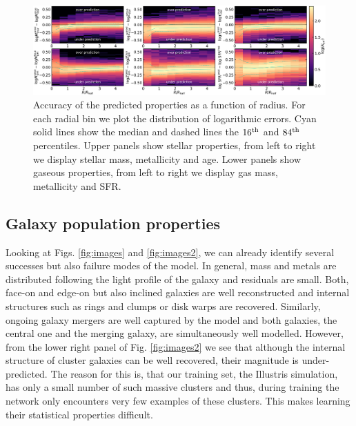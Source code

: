 \documentclass[useAMS,usenatbib]{mnras}
\begin{document}
\begin{figure}
\begin{center}
\includegraphics[width=\textwidth]{./plots/radial_dependence_masked_ugriz.pdf}
\end{center}
\vspace{-.35cm}
\caption{Accuracy of the predicted properties as a function of radius. For each radial bin we plot the distribution of logarithmic errors. Cyan solid lines show the median and dashed lines the $16^{\rm th}$ and $84^{\rm th}$ percentiles. Upper panels show stellar properties, from left to right we display stellar mass, metallicity and age. Lower panels show gaseous properties, from left to right we display gas mass, metallicity and SFR.}
\label{fig:true_vs_pred_rad}
\end{figure}

\subsection{Galaxy population properties}

Looking at Figs. \ref{fig:images} and \ref{fig:images2}, we can already identify several successes but also failure modes of the model. In general, mass and metals are distributed following the light profile of the galaxy and residuals are small. Both, face-on and edge-on but also inclined galaxies are well reconstructed and internal structures such as rings and clumps or disk warps are recovered.
Similarly, ongoing galaxy mergers are well captured by the model and both galaxies, the central one and the merging galaxy, are simultaneously well modelled. 
However, from the lower right panel of Fig. \ref{fig:images2} we see that although the internal structure of cluster galaxies can be well recovered, their magnitude is under-predicted. The reason for this is, that our training set, the Illustris simulation, has only a small number of such massive clusters and thus, during training the network only encounters very few examples of these clusters. This makes learning their statistical properties difficult.
\end{document}
